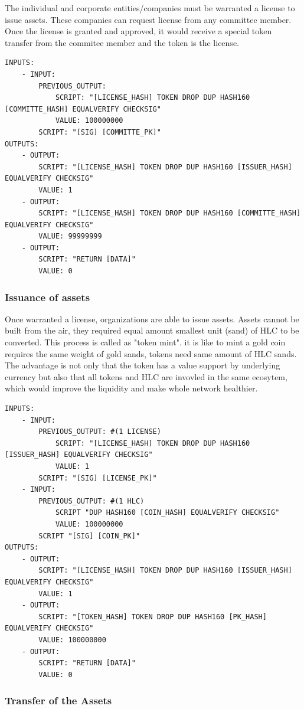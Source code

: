 \documentclass[a4paper,11pt]{article}
\begin{document}
The individual and corporate entities/companies must be warranted a license to issue assets. These companies can request license from any committee member. Once the license is granted and approved, it would receive a special token transfer from the commitee member and the token is the license.

\lstset{basicstyle=\tiny,style=myListStyle}
\begin{lstlisting}
INPUTS:
	- INPUT:
		PREVIOUS_OUTPUT:
			SCRIPT: "[LICENSE_HASH] TOKEN DROP DUP HASH160 [COMMITTE_HASH] EQUALVERIFY CHECKSIG"
			VALUE: 100000000
		SCRIPT: "[SIG] [COMMITTE_PK]"
OUTPUTS:
	- OUTPUT:
		SCRIPT: "[LICENSE_HASH] TOKEN DROP DUP HASH160 [ISSUER_HASH] EQUALVERIFY CHECKSIG"
		VALUE: 1
	- OUTPUT:
		SCRIPT: "[LICENSE_HASH] TOKEN DROP DUP HASH160 [COMMITTE_HASH] EQUALVERIFY CHECKSIG"
		VALUE: 99999999
	- OUTPUT:
		SCRIPT: "RETURN [DATA]" 
		VALUE: 0
\end{lstlisting}

\subsubsection{Issuance of assets}
Once warranted a license, organizations are able to issue assets. Assets cannot be built from the air, they required equal amount smallest unit (sand) of HLC to be converted. This process is called as "token mint". it is like to mint a gold coin requires the same weight of gold sands, tokens need same amount of HLC sands. The advantage is not only that the token has a value support by underlying currency but also that all tokens and HLC are invovled in the same ecosytem, which would improve the liquidity and make whole network healthier.

\lstset{basicstyle=\tiny,style=myListStyle}
\begin{lstlisting}
INPUTS:
	- INPUT:
		PREVIOUS_OUTPUT: #(1 LICENSE)
			SCRIPT: "[LICENSE_HASH] TOKEN DROP DUP HASH160 [ISSUER_HASH] EQUALVERIFY CHECKSIG"
			VALUE: 1
		SCRIPT: "[SIG] [LICENSE_PK]"
	- INPUT:
		PREVIOUS_OUTPUT: #(1 HLC)
			SCRIPT "DUP HASH160 [COIN_HASH] EQUALVERIFY CHECKSIG"
			VALUE: 100000000
		SCRIPT "[SIG] [COIN_PK]"
OUTPUTS:
	- OUTPUT:
		SCRIPT: "[LICENSE_HASH] TOKEN DROP DUP HASH160 [ISSUER_HASH] EQUALVERIFY CHECKSIG"
		VALUE: 1
	- OUTPUT:
		SCRIPT: "[TOKEN_HASH] TOKEN DROP DUP HASH160 [PK_HASH] EQUALVERIFY CHECKSIG"
		VALUE: 100000000
	- OUTPUT:
		SCRIPT: "RETURN [DATA]"
		VALUE: 0
\end{lstlisting}

\subsubsection{Transfer of the Assets}
\end{document}

